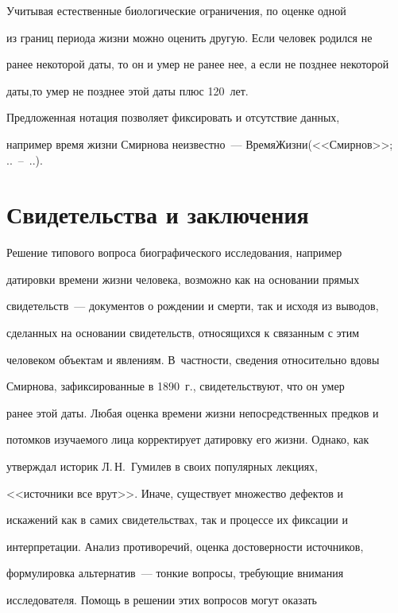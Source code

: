      Учитывая естественные биологические ограничения, по оценке одной 


из границ периода жизни можно оценить другую. Если человек родился не 


ранее некоторой даты, то он и умер не ранее нее, а если не позднее некоторой 


да\-ты,\linebreak то умер не позднее этой даты плюс 120~лет.


     Предложенная нотация поз\-во\-ля\-ет фиксировать и отсутствие данных, 


например  время жизни Смирнова  не\-из\-вест\-но~--- ВремяЖизни(<<Смирнов>>; ..~--~..).





\section{Свидетельства и заключения}


     


     Решение типового вопроса биографического исследования, например  


датировки времени жизни человека, возможно как на основании прямых 


свидетельств~--- документов о рождении и смерти, так и исходя из выводов, 


сделанных на основании свидетельств, относящихся к связанным с этим 


человеком объектам и явлениям. В~частности, сведения относительно вдовы 


Смирнова, зафиксированные в 1890~г., свидетельствуют, что он умер 


ранее этой даты.  Любая оценка времени жизни непосредственных предков и 


потомков изучаемого лица корректирует датировку его жизни. Однако, как 


утверждал историк Л.\,Н.~Гумилев в своих популярных лекциях, 


<<источники все врут>>.  Иначе, существует множество дефектов и 


искажений как в самих свидетельствах, так и процессе их фиксации и 


интерпретации.  Анализ противоречий,  оценка достоверности источников, 


формулировка альтернатив~--- тонкие вопросы, требующие внимания 


исследователя. Помощь в решении этих вопросов могут оказать 


